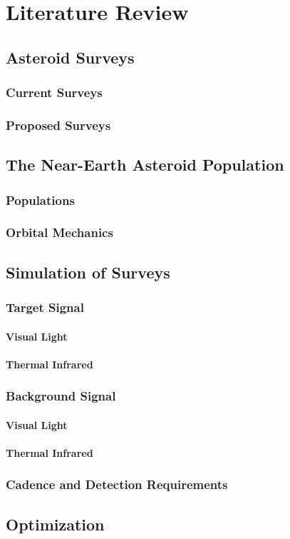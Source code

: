 \chapter{Literature Review}


\section{Asteroid Surveys}

\subsection{Current Surveys}

\subsection{Proposed Surveys}


\section{The Near-Earth Asteroid Population}

\subsection{Populations}

\subsection{Orbital Mechanics}


\section{Simulation of Surveys}

\subsection{Target Signal}
\subsubsection{Visual Light}
\subsubsection{Thermal Infrared}

\subsection{Background Signal}
\subsubsection{Visual Light}
\subsubsection{Thermal Infrared}

\subsection{Cadence and Detection Requirements}


\section{Optimization}
